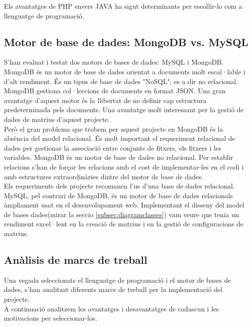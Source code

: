 Els avantatges de PHP envers JAVA ha sigut determinants per escollir-lo com a llenguatge de programació.

\subsection{Motor de base de dades: MongoDB vs. MySQL}
S'han evaluat i testat dos motors de bases de dades: MySQL i MongoDB.\\

MongoDB \'{e}s un motor de base de dades orientat a documents molt escal·lable i d'alt rendiment.\cite{mongodb} \'{E}s un tipus de base de dades "NoSQL"; es a dir no relacional.\cite{nosql} MongoDB gestiona col·leccions de documents en format JSON.\cite{apijson} Una gran avantatge d'aquest motor \'{e}s la llibertat de no definir cap estructura predeterminada pels documents. Una avantatge molt interessant per la gestió de dades de matrius d'aquest projecte.\\

Però el gran problema que trobem per aquest projecte en MongoDB \'{e}s la absència del model relacional. \'{E}s molt important el requeriment relacional de dades per gestionar la associació entre conjunts de fitxers, els fitxers i les variables. MongoDB \'{e}s un motor de base de dades no relacional. Per establir relacions s'han de forçar les relacions amb el cost de implementar-les en el codi i amb estructures extraordinàries dintre del motor de base de dades.\\

Els requeriments dels projecte recomanen l'us d'una base de dades relacional. MySQL, pel contrari de MongoDB, \'{e}s un motor de base de dades relacionals àmpliament usat en el desenvolupament web. Implementant el disseny del model de bases dades(mirar la seccio \ref{subsec:diagramclasses}) vam veure que tenia un rendiment excel·lent en la creació de matrius i en la gestió de configuracions de matrius.

\subsection{Anàlisis de marcs de treball}
Una vegada seleccionats el llenguatge de programació i el motor de bases de dades, s'han analitzat diferents marcs de treball per la implementació del projecte.\\

A continuació analitzem les avantatges i desavantatges de cadascun i les motivacions per seleccionar-los.

